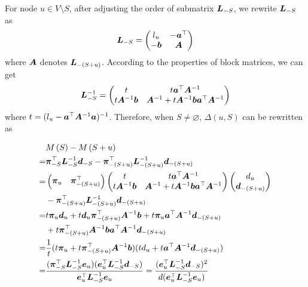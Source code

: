 \documentclass[sigconf]{acmart}
\begin{document}
For node \(u\in V\setminus S\), after adjusting the order of submatrix \(\boldsymbol{L}_{-S}\), we rewrite \(\boldsymbol{L}_{-S}\) as
\[\boldsymbol{L}_{-S}=\begin{pmatrix}l_u & -\boldsymbol{a}^\top \\-\boldsymbol{b}&\boldsymbol{A}\end{pmatrix}\]
where \(\boldsymbol{A}\) denotes \(\boldsymbol{L}_{-(S+u)}\).
According to the properties of block matrices, we can get
\[\boldsymbol{L}_{-S}^{-1}=\begin{pmatrix}
        t & t\boldsymbol{a}^\top\boldsymbol{A}^{-1} \\t\boldsymbol{A}^{-1}\boldsymbol{b}&\boldsymbol{A}^{-1}+t\boldsymbol{A}^{-1}\boldsymbol{b}\boldsymbol{a}^\top\boldsymbol{A}^{-1}
    \end{pmatrix}\]
where \(t=(l_u-\boldsymbol{a}^\top\boldsymbol{A}^{-1}\boldsymbol{a})^{-1}\).
Therefore, when \(S\neq\varnothing\), \(\Delta(u,S)\) can be rewritten as

\begin{equation}\label{eq:margin-deriv}
    \begin{split}
        &M\left(S\right)-M\left(S+u\right)\\
        =&\boldsymbol{\pi}_{-S}^\top\boldsymbol{L}_{-S}^{-1}\boldsymbol{d}_{-S}-\boldsymbol{\pi}_{-(S+u)}^\top\boldsymbol{L}_{-(S+u)}^{-1}\boldsymbol{d}_{-(S+u)}\\
        =&\begin{pmatrix}\boldsymbol{\pi}_u&\boldsymbol{\pi}_{-(S+u)}^\top\end{pmatrix}\begin{pmatrix}t & t\boldsymbol{a}^\top\boldsymbol{A}^{-1} \\t\boldsymbol{A}^{-1}\boldsymbol{b}&\boldsymbol{A}^{-1}+t\boldsymbol{A}^{-1}\boldsymbol{b}\boldsymbol{a}^\top\boldsymbol{A}^{-1}\end{pmatrix}\begin{pmatrix}d_u\\\boldsymbol{d}_{-(S+u)}\end{pmatrix}\\
        &-\boldsymbol{\pi}_{-(S+u)}^\top\boldsymbol{L}_{-(S+u)}^{-1}\boldsymbol{d}_{-(S+u)}\\
        =&t\boldsymbol{\pi}_u\boldsymbol{d}_u+t\boldsymbol{d}_u\boldsymbol{\pi}_{-(S+u)}^\top\boldsymbol{A}^{-1}\boldsymbol{b}+t\boldsymbol{\pi}_u\boldsymbol{a}^\top\boldsymbol{A}^{-1}\boldsymbol{d}_{-(S+u)}\\
        &+t\boldsymbol{\pi}_{-(S+u)}^\top\boldsymbol{A}^{-1}\boldsymbol{b}\boldsymbol{a}^\top\boldsymbol{A}^{-1}\boldsymbol{d}_{-(S+u)}\\
        =&\frac1t(t\boldsymbol{\pi}_u+t\boldsymbol{\pi}_{-(S+u)}^\top\boldsymbol{A}^{-1}\boldsymbol{b})(td_u+t\boldsymbol{a}^\top\boldsymbol{A}^{-1}\boldsymbol{d}_{-(S+u)})\\
        =&\frac{(\boldsymbol{\pi}_{-S}^\top\boldsymbol{L}_{-S}^{-1}\boldsymbol{e}_u)(\boldsymbol{e}_u^\top\boldsymbol{L}_{-S}^{-1}\boldsymbol{d}_{-S})}{\boldsymbol{e}_u^\top\boldsymbol{L}_{-S}^{-1}\boldsymbol{e}_u}=\frac{(\boldsymbol{e}_u^\top\boldsymbol{L}_{-S}^{-1}\boldsymbol{d}_{-S})^2}{d(\boldsymbol{e}_u^\top\boldsymbol{L}_{-S}^{-1}\boldsymbol{e}_u)}
    \end{split}
\end{equation}
\end{document}
